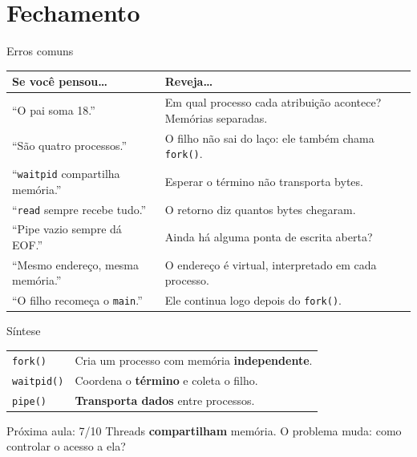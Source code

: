 \documentclass[aspectratio=169]{beamer}
\begin{document}
\section{Fechamento}

\begin{frame}{Erros comuns}
\begin{center}
\small
\begin{tabular}{@{}p{4.6cm}p{8.4cm}@{}}
\toprule
\textbf{Se você pensou\ldots} & \textbf{Reveja\ldots} \\
\midrule
``O pai soma 18.'' & Em qual processo cada atribuição acontece? Memórias separadas. \\
``São quatro processos.'' & O filho não sai do laço: ele também chama \texttt{fork()}. \\
``\texttt{waitpid} compartilha memória.'' & Esperar o término não transporta bytes. \\
``\texttt{read} sempre recebe tudo.'' & O retorno diz quantos bytes chegaram. \\
``Pipe vazio sempre dá EOF.'' & Ainda há alguma ponta de escrita aberta? \\
``Mesmo endereço, mesma memória.'' & O endereço é virtual, interpretado em cada processo. \\
``O filho recomeça o \texttt{main}.'' & Ele continua logo depois do \texttt{fork()}. \\
\bottomrule
\end{tabular}
\end{center}
\end{frame}

\begin{frame}{Síntese}
\begin{center}
\begin{tabular}{@{}lp{9.5cm}@{}}
\toprule
\texttt{fork()}    & Cria um processo com memória \textbf{independente}. \\
\texttt{waitpid()} & Coordena o \textbf{término} e coleta o filho. \\
\texttt{pipe()}    & \textbf{Transporta dados} entre processos. \\
\bottomrule
\end{tabular}
\end{center}

\vspace{0.8em}
\begin{exampleblock}{Próxima aula: 7/10}
Threads \textbf{compartilham} memória. O problema muda: como controlar o acesso a ela?
\end{exampleblock}
\end{frame}
\end{document}

